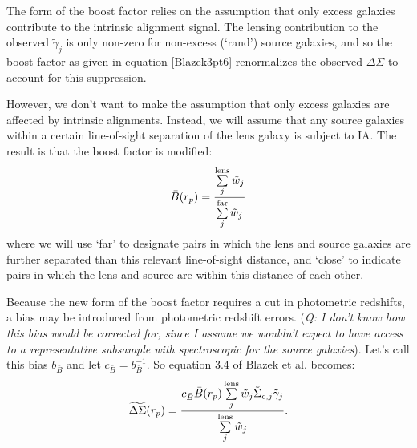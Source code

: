 \documentclass[onecolumn,amsmath,aps,fleqn, superscriptaddress]{revtex4}
\begin{document}
The form of the boost factor relies on the assumption that only excess galaxies contribute to the intrinsic alignment signal. The lensing contribution to the observed $\tilde\gamma_j$ is only non-zero for non-excess (`rand') source galaxies, and so the boost factor as given in equation \ref{Blazek3pt6} renormalizes the observed $\Delta \Sigma$ to account for this suppression.

However, we don't want to make the assumption that only excess galaxies are affected by intrinsic alignments. Instead, we will assume that any source galaxies within a certain line-of-sight separation of the lens galaxy is subject to IA. The result is that the boost factor is modified:
\begin{equation}
\bar{B}(r_p) = \frac{\sum\limits_{j}^{\rm lens}\tilde{w}_j}{\sum\limits_{j}^{\rm far} \tilde{w}_j}
\label{modboost}
\end{equation}
where we will use `far' to designate pairs in which the lens and source galaxies are further separated than this relevant line-of-sight distance, and `close' to indicate pairs in which the lens and source are within this distance of each other.

Because the new form of the boost factor requires a cut in photometric redshifts, a bias may be introduced from photometric redshift errors. ({\it Q: I don't know how this bias would be corrected for, since I assume we wouldn't expect to have access to a representative subsample with spectroscopic for the source galaxies}). Let's call this bias $b_{\bar{B}}$ and let $c_{\bar{B}} = b_{\bar B}^{-1}$. So equation 3.4 of Blazek et al. becomes:
\begin{equation}
\widetilde{\Delta \Sigma}(r_p) = \frac{c_{\bar B} \bar{B}(r_p) \sum\limits_{j}^{\rm lens} \tilde{w}_j \tilde{\Sigma}_{c,j} \tilde{\gamma}_j}{\sum\limits_{j}^{\rm lens} \tilde{w}_j}.
\label{update3pt4}
\end{equation}
\end{document}
